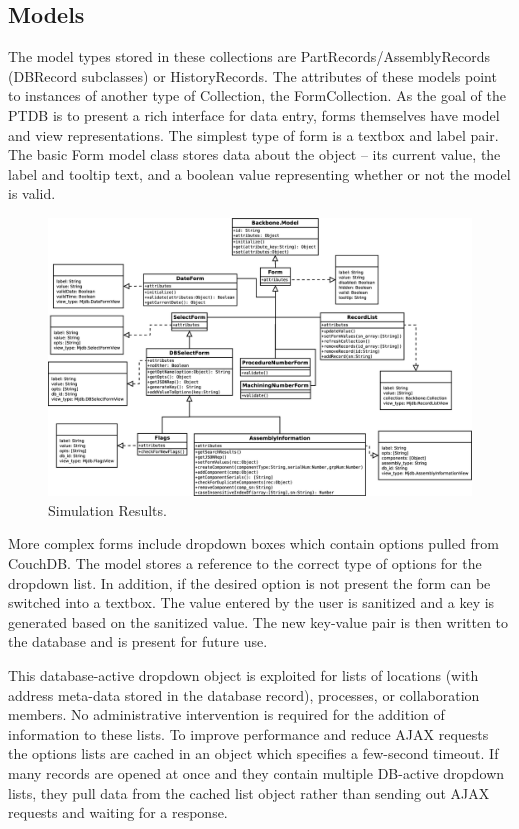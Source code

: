 \documentclass[journal]{IEEEtran}
\begin{document}
\subsection{Models}

The model types stored in these collections are PartRecords/AssemblyRecords (DBRecord subclasses) or HistoryRecords.
The attributes of these models point to instances of another type of Collection,
the FormCollection. As the goal of the PTDB is to present a rich interface for data entry, forms
themselves have model and view representations. The simplest type of form is a textbox and label 
pair. The basic Form model class stores data about the object -- its current value, the label and tooltip text,
and a boolean value representing whether or not the model is valid.

\begin{figure}[!p]
\centering
\includegraphics[width=7.5in]{Models}
\caption{Simulation Results.}
\label{models}
\end{figure}

More complex forms include dropdown boxes which contain options pulled from CouchDB. The model
stores a reference to the correct type of options for the dropdown list. In addition, if the 
desired option is not present the form can be switched into a textbox. The value entered by
the user is sanitized and a key is generated based on the sanitized value. The new key-value
pair is then written to the database and is present for future use.

This database-active dropdown object is exploited for lists of locations (with address meta-data
stored in the database record), processes, or collaboration members. No administrative intervention
is required for the addition of information to these lists. To improve performance and reduce
AJAX requests the options lists are cached in an object which specifies a few-second timeout.
If many records are opened at once and they contain multiple DB-active dropdown lists, they 
pull data from the cached list object rather than sending out AJAX requests and waiting for 
a response.
\end{document}
